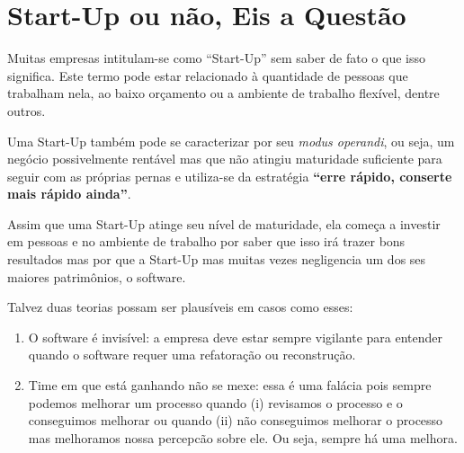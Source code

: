 \section{Start-Up ou não, Eis a Questão}

Muitas empresas intitulam-se como ``Start-Up'' sem saber de fato o que isso significa. Este termo pode estar relacionado à quantidade de pessoas que trabalham nela, ao baixo orçamento ou a ambiente de trabalho flexível, dentre outros.

Uma Start-Up também pode se caracterizar por seu \emph{modus operandi}, ou seja, um negócio possivelmente rentável mas que não atingiu maturidade suficiente para seguir com as próprias pernas e utiliza-se da estratégia \textbf{``erre rápido, conserte mais rápido ainda''}. 

Assim que uma Start-Up atinge seu nível de maturidade, ela começa a investir em pessoas e no ambiente de trabalho por saber que isso irá trazer bons resultados mas por que a Start-Up mas muitas vezes negligencia um dos ses maiores patrimônios, o software.

Talvez duas teorias possam ser plausíveis em casos como esses:
\begin{enumerate}
    \item O software é invisível: a empresa deve estar sempre vigilante para entender quando o software requer uma refatoração ou reconstrução.
    \item Time em que está ganhando não se mexe: essa é uma falácia pois sempre podemos melhorar um processo quando (i) revisamos o processo e o conseguimos melhorar ou quando (ii) não conseguimos melhorar o processo mas melhoramos nossa percepcão sobre ele. Ou seja, sempre há uma melhora.

\end{enumerate}